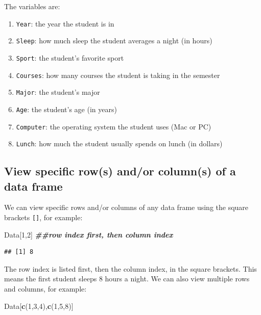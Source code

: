 \documentclass[
]{book}
\newenvironment{Shaded}{\begin{snugshade}}{\end{snugshade}}
\newcommand{\DecValTok}[1]{\textcolor[rgb]{0.00,0.00,0.81}{#1}}
\newcommand{\DocumentationTok}[1]{\textcolor[rgb]{0.56,0.35,0.01}{\textbf{\textit{#1}}}}
\newcommand{\FunctionTok}[1]{\textcolor[rgb]{0.13,0.29,0.53}{\textbf{#1}}}
\newcommand{\NormalTok}[1]{#1}
\providecommand{\tightlist}{%
  \setlength{\itemsep}{0pt}\setlength{\parskip}{0pt}}
\begin{document}
The variables are:

\begin{enumerate}
\def\labelenumi{\arabic{enumi}.}
\tightlist
\item
  \texttt{Year}: the year the student is in
\item
  \texttt{Sleep}: how much sleep the student averages a night (in hours)
\item
  \texttt{Sport}: the student's favorite sport
\item
  \texttt{Courses}: how many courses the student is taking in the semester
\item
  \texttt{Major}: the student's major
\item
  \texttt{Age}: the student's age (in years)
\item
  \texttt{Computer}: the operating system the student uses (Mac or PC)
\item
  \texttt{Lunch}: how much the student usually spends on lunch (in dollars)
\end{enumerate}

\hypertarget{view-specific-rows-andor-columns-of-a-data-frame}{%
\subsection{View specific row(s) and/or column(s) of a data frame}\label{view-specific-rows-andor-columns-of-a-data-frame}}

We can view specific rows and/or columns of any data frame using the square brackets \texttt{{[}{]}}, for example:

\begin{Shaded}
\begin{Highlighting}[]
\NormalTok{Data[}\DecValTok{1}\NormalTok{,}\DecValTok{2}\NormalTok{] }\DocumentationTok{\#\#row index first, then column index}
\end{Highlighting}
\end{Shaded}

\begin{verbatim}
## [1] 8
\end{verbatim}

The row index is listed first, then the column index, in the square brackets. This means the first student sleeps 8 hours a night. We can also view multiple rows and columns, for example:

\begin{Shaded}
\begin{Highlighting}[]
\NormalTok{Data[}\FunctionTok{c}\NormalTok{(}\DecValTok{1}\NormalTok{,}\DecValTok{3}\NormalTok{,}\DecValTok{4}\NormalTok{),}\FunctionTok{c}\NormalTok{(}\DecValTok{1}\NormalTok{,}\DecValTok{5}\NormalTok{,}\DecValTok{8}\NormalTok{)]}
\end{Highlighting}
\end{Shaded}
\end{document}
